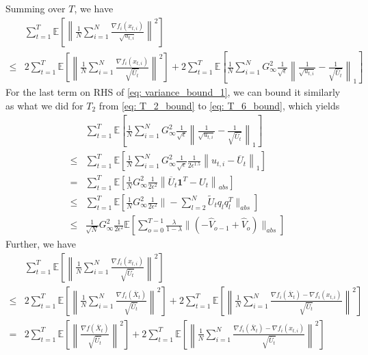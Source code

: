 \documentclass{article} %
\begin{document}
Summing over $T$, we have
\begin{align}\label{eq: variance_bound_1}
&\sum_{t=1}^T \mathbb E \left[  \left\| \frac{1}{N} \sum_{i=1}^N \frac{\nabla f_i(x_{t,i})}{\sqrt{u_{t,i}}} \right\|^2     \right]   \nonumber \\
\leq & 2\sum_{t=1}^T \mathbb E \left[  \left\|\frac{1}{N} \sum_{i=1}^N \frac{\nabla f_i(x_{t,i})}{\sqrt{\overline U_t}  } \right\|^2 \right] + 2 \sum_{t=1}^T \mathbb E \left[  \frac{1}{N} \sum_{i=1}^N G_{\infty}^2  \frac{1}{\sqrt{\epsilon}}\left\|     \frac{1}{\sqrt{u_{t,i}}} - \frac{1}{\sqrt{\overline U_{t}}}  \right\|_1     \right]
\end{align}
For the last term on RHS of \eqref{eq: variance_bound_1}, we can bound it similarly as what we did for $T_2$ from \eqref{eq: T_2_bound} to \eqref{eq: T_6_bound}, which yields
\begin{align}\label{eq: diff_u}
&\sum_{t=1}^T \mathbb E \left[  \frac{1}{N} \sum_{i=1}^N G_{\infty}^2  \frac{1}{\sqrt{\epsilon}}\left\|     \frac{1}{\sqrt{u_{t,i}}} - \frac{1}{\sqrt{\overline U_{t}}}  \right\|_1     \right]  \nonumber \\
\leq & \sum_{t=1}^T \mathbb E \left[  \frac{1}{N} \sum_{i=1}^N G_{\infty}^2  \frac{1}{\sqrt{\epsilon}} \frac{1}{2\epsilon^{1.5}} \left\|  u_{t,i} -    \overline U_{t}  \right\|_1     \right] \nonumber \\
=& \sum_{t=1}^T \mathbb E \left[  \frac{1}{N}  G_{\infty}^2 \frac{1}{2\epsilon^2} \left\|     \overline U_{t} \mathbf 1^T - U_{t}  \right\|_{abs}    \right]  \nonumber \\
\leq & \sum_{t=1}^T \mathbb E \left[  \frac{1}{N}  G_{\infty}^2 \frac{1}{2\epsilon^2} \| - \sum_{l=2}^N   \tilde U_t q_l q_l^T \|_{abs}    \right] \nonumber \\ 
\leq & \frac{1}{\sqrt{N}}  G_{\infty}^2 \frac{1}{2\epsilon^2}   \mathbb E \left[   \sum_{o=0}^{T-1} \frac{\lambda}{1-\lambda}     \|    (- \hat V_{o-1} + \hat V_{o} ) \|_{abs}    \right] 
\end{align}
Further, we have 
\begin{align}
&\sum_{t=1}^T \mathbb E \left[  \left\|\frac{1}{N} \sum_{i=1}^N \frac{\nabla f_i(x_{t,i})}{\sqrt{\overline U_t}  } \right\|^2 \right]  \nonumber \\
\leq & 2 \sum_{t=1}^T \mathbb E \left[  \left\|\frac{1}{N} \sum_{i=1}^N \frac{\nabla f_i(\overline X_{t})}{\sqrt{\overline U_t}  } \right\|^2 \right] + 2 \sum_{t=1}^T \mathbb E \left[  \left\|\frac{1}{N} \sum_{i=1}^N \frac{\nabla f_i(\overline X_t) - \nabla f_i(x_{t,i})}{\sqrt{\overline U_t}  } \right\|^2 \right] \nonumber \\
= & 2 \sum_{t=1}^T \mathbb E \left[  \left\| \frac{\nabla f(\overline X_{t})}{\sqrt{\overline U_t}  } \right\|^2 \right] + 2 \sum_{t=1}^T \mathbb E \left[  \left\|\frac{1}{N} \sum_{i=1}^N \frac{\nabla f_i(\overline X_t) - \nabla f_i(x_{t,i})}{\sqrt{\overline U_t}  } \right\|^2 \right] 
\end{align}
\end{document}
